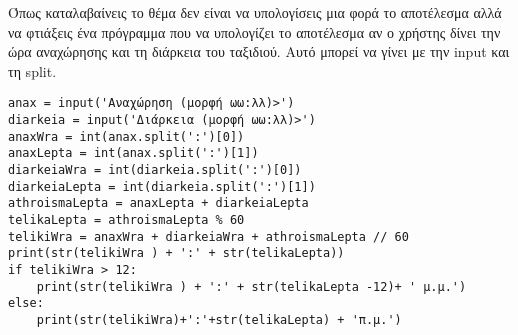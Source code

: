 Όπως καταλαβαίνεις το θέμα δεν είναι να υπολογίσεις μια φορά το αποτέλεσμα αλλά να φτιάξεις ένα πρόγραμμα που να υπολογίζει το αποτέλεσμα αν ο χρήστης δίνει την ώρα αναχώρησης και τη διάρκεια του ταξιδιού. Αυτό μπορεί να γίνει με την input και τη split.
\begin{lstlisting}
anax = input('Αναχώρηση (μορφή ωω:λλ)>')
diarkeia = input('Διάρκεια (μορφή ωω:λλ)>')
anaxWra = int(anax.split(':')[0])
anaxLepta = int(anax.split(':')[1])
diarkeiaWra = int(diarkeia.split(':')[0])
diarkeiaLepta = int(diarkeia.split(':')[1])
athroismaLepta = anaxLepta + diarkeiaLepta
telikaLepta = athroismaLepta % 60
telikiWra = anaxWra + diarkeiaWra + athroismaLepta // 60
print(str(telikiWra ) + ':' + str(telikaLepta))
if telikiWra > 12:
    print(str(telikiWra ) + ':' + str(telikaLepta -12)+ ' μ.μ.')
else:
    print(str(telikiWra)+':'+str(telikaLepta) + 'π.μ.')
\end{lstlisting}

